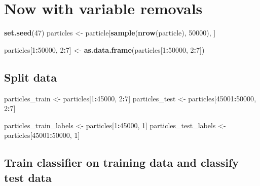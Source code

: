 \documentclass[
]{article}
\newenvironment{Shaded}{\begin{snugshade}}{\end{snugshade}}
\newcommand{\DecValTok}[1]{\textcolor[rgb]{0.00,0.00,0.81}{#1}}
\newcommand{\KeywordTok}[1]{\textcolor[rgb]{0.13,0.29,0.53}{\textbf{#1}}}
\newcommand{\NormalTok}[1]{#1}
\newcommand{\OperatorTok}[1]{\textcolor[rgb]{0.81,0.36,0.00}{\textbf{#1}}}
\newcommand{\StringTok}[1]{\textcolor[rgb]{0.31,0.60,0.02}{#1}}
\begin{document}
\hypertarget{now-with-variable-removals}{%
\section{Now with variable removals}\label{now-with-variable-removals}}

\begin{Shaded}
\begin{Highlighting}[]
\KeywordTok{set.seed}\NormalTok{(}\DecValTok{47}\NormalTok{)}
\NormalTok{particles <-}\StringTok{ }\NormalTok{particle[}\KeywordTok{sample}\NormalTok{(}\KeywordTok{nrow}\NormalTok{(particle), }\DecValTok{50000}\NormalTok{), ]}

\NormalTok{particles[}\DecValTok{1}\OperatorTok{:}\DecValTok{50000}\NormalTok{, }\DecValTok{2}\OperatorTok{:}\DecValTok{7}\NormalTok{] <-}\StringTok{ }\KeywordTok{as.data.frame}\NormalTok{(particles[}\DecValTok{1}\OperatorTok{:}\DecValTok{50000}\NormalTok{, }\DecValTok{2}\OperatorTok{:}\DecValTok{7}\NormalTok{])}
\end{Highlighting}
\end{Shaded}

\hypertarget{split-data-1}{%
\subsection{Split data}\label{split-data-1}}

\begin{Shaded}
\begin{Highlighting}[]
\NormalTok{particles_train <-}\StringTok{ }\NormalTok{particles[}\DecValTok{1}\OperatorTok{:}\DecValTok{45000}\NormalTok{, }\DecValTok{2}\OperatorTok{:}\DecValTok{7}\NormalTok{]}
\NormalTok{particles_test <-}\StringTok{ }\NormalTok{particles[}\DecValTok{45001}\OperatorTok{:}\DecValTok{50000}\NormalTok{, }\DecValTok{2}\OperatorTok{:}\DecValTok{7}\NormalTok{]}

\NormalTok{particles_train_labels <-}\StringTok{ }\NormalTok{particles[}\DecValTok{1}\OperatorTok{:}\DecValTok{45000}\NormalTok{, }\DecValTok{1}\NormalTok{]}
\NormalTok{particles_test_labels <-}\StringTok{ }\NormalTok{particles[}\DecValTok{45001}\OperatorTok{:}\DecValTok{50000}\NormalTok{, }\DecValTok{1}\NormalTok{]}
\end{Highlighting}
\end{Shaded}

\hypertarget{train-classifier-on-training-data-and-classify-test-data-3}{%
\subsection{Train classifier on training data and classify test
data}\label{train-classifier-on-training-data-and-classify-test-data-3}}
\end{document}
